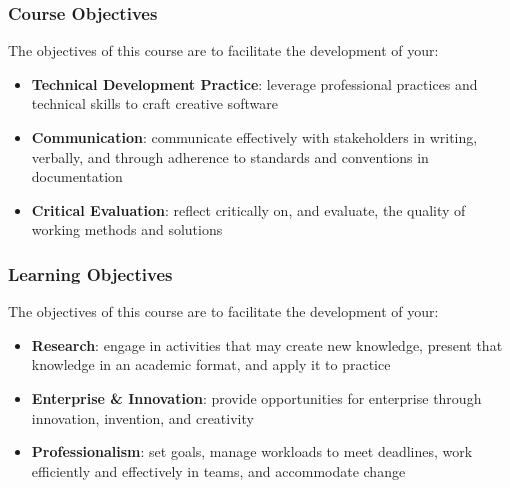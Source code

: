 \begin{frame}
	\frametitle{Course Objectives}
	
	The objectives of this course are to facilitate the development of your: \pause
	
	\begin{itemize}
		\item \textbf{Technical Development Practice}: leverage professional practices and technical skills to craft creative software \pause
		\item \textbf{Communication}: communicate effectively with stakeholders in writing, verbally, and through adherence to standards and conventions in documentation \pause
		\item \textbf{Critical Evaluation}: reflect critically on, and evaluate, the quality of working methods and solutions
	\end{itemize}
\end{frame}

\begin{frame}
	\frametitle{Learning Objectives}
	
	The objectives of this course are to facilitate the development of your:
	
	\begin{itemize}
		\item \textbf{Research}: engage in activities that may create new knowledge, present that knowledge in an academic format, and apply it to practice\pause
		\item \textbf{Enterprise \& Innovation}: provide opportunities for enterprise through innovation, invention, and creativity\pause
		\item \textbf{Professionalism}: set goals, manage workloads to meet deadlines, work efficiently and effectively in teams, and accommodate change
	\end{itemize}
\end{frame}

